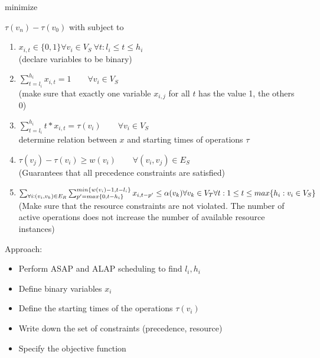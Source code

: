 \begin{theorem}

minimize 

$\tau(v_n) - \tau(v_0)$ with subject to 

\begin{enumerate}


\item $x_{i, t} \in \{ 0, 1 \} \forall v_i \in V_S ~ \forall t: l_i \leq t \leq h_i$ \\
	(declare variables to be binary)

\item $\sum_{t = l_i}^{h_i} x_{i, t} = 1 \qquad \forall v_i \in V_S$ \\
	(make sure that exactly one variable $x_{i, j}$ for all $t$ has the value 1, the others 0)

\item $\sum_{t = l_i}^{h_i} t*x_{i, t} = \tau(v_i) \qquad \forall v_i \in V_S$ \\
	determine relation between $x$ and starting times of operations $\tau$



\item $\tau(v_j) - \tau(v_i ) \geq w(v_i) \qquad \forall (v_i, v_j) \in E_S$ \\
	(Guarantees that all precedence constraints are satisfied)

\item $\sum_{\forall i: (v_i, v_k) \in E_R} \sum_{p' = max\{ 0, t- h_i \}}^{ min \{ w(v_i) -1, t - l_i \}}   x_{i, t-p'} \leq \alpha( v_k)  \\
  \forall v_k \in V_T \forall t: 1 \leq t \leq max \{ h_i: v_i \in V_S \}$ \\
  (Make sure that the resource constraints are not violated. The number of active operations does not increase the number of available resource instances)

\end{enumerate}

\end{theorem}


\begin{tnote}
Approach:
\begin{itemize} [noitemsep]
\item Perform ASAP and ALAP scheduling to find $l_i, h_i$
\item Define binary variables $x_i$
\item Define the starting times of the operations $\tau(v_i)$
\item Write down the set of constraints (precedence, resource)
\item Specify the objective function
\end{itemize}
\end{tnote}


